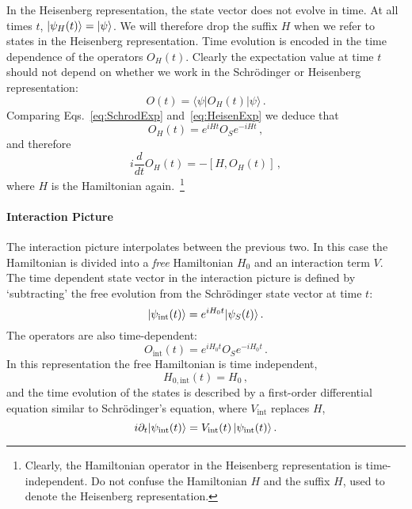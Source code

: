 In the Heisenberg representation, the state vector does not evolve in time. At
all times $t$, $| \psi_H(t) \rangle=| \psi \rangle$. We will therefore drop the suffix
$H$ when we refer to states in the Heisenberg representation. Time evolution is
encoded in the time dependence of the operators $O_H(t)$. Clearly the
expectation value at time $t$ should not depend on whether we work in the
Schr\"odinger or Heisenberg representation:
\begin{equation}
    \label{eq:HeisenExp}
    O(t) = \langle \psi | O_H(t) | \psi \rangle\, .
\end{equation}
Comparing Eqs.~\eqref{eq:SchrodExp} and~\eqref{eq:HeisenExp} we deduce that
\begin{equation}
    \label{eq:HeisenOp}
    O_H(t) = e^{iHt} O_S e^{-iHt}\, ,
\end{equation}
and therefore 
\begin{equation}
    \label{eq:HeisenEvol}
    i \frac{d}{dt} O_H(t) = - \left[H, O_H(t)\right]\, ,
\end{equation}
where $H$ is the Hamiltonian again.~\footnote{Clearly, the Hamiltonian operator
in the Heisenberg representation is time-independent. Do not confuse the
Hamiltonian $H$ and the suffix $H$, used to denote the Heisenberg
representation.}

\paragraph{Interaction Picture}

The interaction picture interpolates between the previous two. In this case the
Hamiltonian is divided into a {\it free} Hamiltonian $H_0$ and an interaction
term $V$. The time dependent state vector in the interaction picture is defined
by `subtracting' the free evolution from the Schr\"odinger state vector at time
$t$:
\begin{equation}
    \label{eq:IntPictEvol}
    | \psi_{\mathrm{int}}(t) \rangle = e^{i H_0 t} | \psi_S(t) \rangle\, .
\end{equation}
The operators are also time-dependent:
\begin{equation}
    \label{eq:IntPictOps}
    O_{\mathrm{int}}(t) = e^{i H_0 t} O_S e^{-i H_0 t}\, .
\end{equation}
In this representation the free Hamiltonian is time independent,
\begin{equation}
    \label{eq:H0IntPict}
    H_{0,\mathrm{int}}(t) = H_0\, ,
\end{equation}
and the time evolution of the states is described by a first-order differential
equation similar to Schr\"odinger's equation, where $V_{\mathrm{int}}$ replaces $H$,
\begin{equation}
    \label{eq:IntPictEvolEq}
    i \partial_t | \psi_{\mathrm{int}}(t) \rangle = V_{\mathrm{int}}(t) \,
    | \psi_{\mathrm{int}}(t) \rangle\, .
\end{equation}

